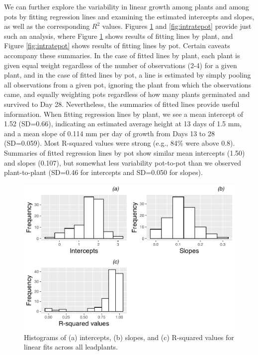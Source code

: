 \documentclass[
]{krantz}
\begin{document}
We can further explore the variability in linear growth among plants and among pots by fitting regression lines and examining the estimated intercepts and slopes, as well as the corresponding \(R^2\) values. Figures \ref{fig:intrateplant} and \ref{fig:intratepot} provide just such an analysis, where Figure \ref{fig:intrateplant} shows results of fitting lines by plant, and Figure \ref{fig:intratepot} shows results of fitting lines by pot. Certain caveats accompany these summaries. In the case of fitted lines by plant, each plant is given equal weight regardless of the number of observations (2-4) for a given plant, and in the case of fitted lines by pot, a line is estimated by simply pooling all observations from a given pot, ignoring the plant from which the observations came, and equally weighting pots regardless of how many plants germinated and survived to Day 28. Nevertheless, the summaries of fitted lines provide useful information. When fitting regression lines by plant, we see a mean intercept of 1.52 (SD=0.66), indicating an estimated average height at 13 days of 1.5 mm, and a mean slope of 0.114 mm per day of growth from Days 13 to 28 (SD=0.059). Most R-squared values were strong (e.g., 84\% were above 0.8). Summaries of fitted regression lines by pot show similar mean intercepts (1.50) and slopes (0.107), but somewhat less variability pot-to-pot than we observed plant-to-plant (SD=0.46 for intercepts and SD=0.050 for slopes).

\begin{figure}

{\centering \includegraphics[width=0.6\linewidth]{bookdown-BeyondMLR_files/figure-latex/intrateplant-1} 

}

\caption{ Histograms of (a) intercepts, (b) slopes, and (c) R-squared values for linear fits across all leadplants.}\label{fig:intrateplant}
\end{figure}
\end{document}
